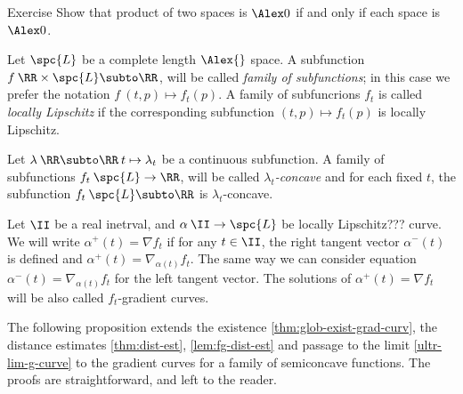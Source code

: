 \begin{thm}{Exercise}\label{ex:cbb-product}
Show that product of two spaces is $\Alex0$ if and only if each space is $\Alex0$.
\end{thm}
















Let $\spc{L}$ be a complete length $\Alex{}$ space.
A subfunction $f\:\RR\times\spc{L}\subto\RR$, will be called \emph{family of subfunctions};
in this case we prefer the notation $f\:(t,p)\mapsto f_t(p)$.
A family of subfuncrions $f_t$ is called 
\emph{locally Lipschitz}%
if the corresponding subfunction $(t,p)\mapsto f_t(p)$ is locally Lipschitz.

Let $\lambda\:\RR\subto\RR\:t\mapsto \lambda_t$ be a continuous subfunction.
A family of subfunctions $f_t\:\spc{L}\to \RR$, will be called \emph{$\lambda_t$-concave} 
and for each fixed $t$, the subfunction $f_t\:\spc{L}\subto\RR$ is $\lambda_t$-concave. 

Let $\II$ be a real inetrval, and $\alpha\:\II\to\spc{L}$ be locally Lipschitz??? curve.
We will write 
$\alpha^+(t)=\nabla f_t$
if for any $t\in \II$, the right tangent vector $\alpha^-(t)$
is defined and $\alpha^+(t)=\nabla_{\alpha(t)}f_t$.
The same way we can consider equation $\alpha^-(t)=\nabla_{\alpha(t)}f_t$
for the left tangent vector.
The solutions of $\alpha^+(t)=\nabla f_t$ will be also called $f_t$-gradient curves.

The following proposition extends
the existence \ref{thm:glob-exist-grad-curv},
the distance estimates \ref{thm:dist-est}, \ref{lem:fg-dist-est}
and passage to the limit \ref{ultr-lim-g-curve} to the gradient curves for a family of semiconcave functions.
The proofs are straightforward, and left to the reader.

